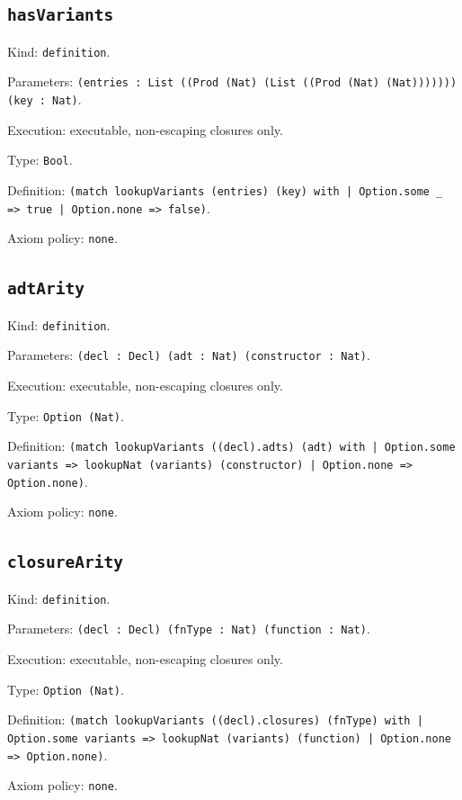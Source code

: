 \documentclass[11pt]{article}
\begin{document}
\subsection*{\texttt{hasVariants}}
\noindent Kind: \texttt{definition}.\par
\noindent Parameters: \texttt{(entries : List ((Prod (Nat) (List ((Prod (Nat) (Nat))))))) (key : Nat)}.\par
\noindent Execution: executable, non-escaping closures only.\par
\noindent Type: \texttt{Bool}.\par
\noindent Definition: \texttt{(match lookupVariants (entries) (key) with | Option.some \_ => true | Option.none => false)}.\par
\noindent Axiom policy: \texttt{none}.\par
\subsection*{\texttt{adtArity}}
\noindent Kind: \texttt{definition}.\par
\noindent Parameters: \texttt{(decl : Decl) (adt : Nat) (constructor : Nat)}.\par
\noindent Execution: executable, non-escaping closures only.\par
\noindent Type: \texttt{Option (Nat)}.\par
\noindent Definition: \texttt{(match lookupVariants ((decl).adts) (adt) with | Option.some variants => lookupNat (variants) (constructor) | Option.none => Option.none)}.\par
\noindent Axiom policy: \texttt{none}.\par
\subsection*{\texttt{closureArity}}
\noindent Kind: \texttt{definition}.\par
\noindent Parameters: \texttt{(decl : Decl) (fnType : Nat) (function : Nat)}.\par
\noindent Execution: executable, non-escaping closures only.\par
\noindent Type: \texttt{Option (Nat)}.\par
\noindent Definition: \texttt{(match lookupVariants ((decl).closures) (fnType) with | Option.some variants => lookupNat (variants) (function) | Option.none => Option.none)}.\par
\noindent Axiom policy: \texttt{none}.\par
\end{document}
